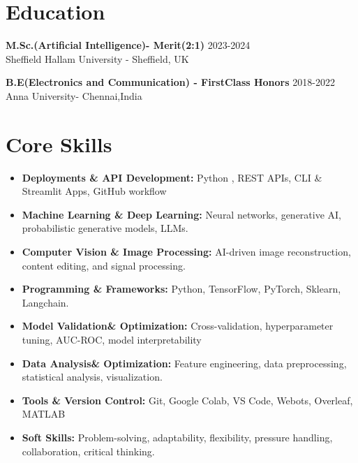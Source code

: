\documentclass[10 pt, letterpaper]{article}
\begin{document}
\section*{Education}
\textbf{M.Sc.(Artificial Intelligence)- Merit(2:1) }\hfill{2023-2024} \\ Sheffield Hallam University - Sheffield, UK

\textbf{B.E(Electronics and Communication) - FirstClass Honors }\hfill{2018-2022} \\ Anna University- Chennai,India
\vspace{-0.3cm}
\section*{Core Skills}

\begin{itemize}
    \item \textbf{Deployments \& API Development:} Python , REST APIs, CLI \& Streamlit Apps, GitHub workflow
    \vspace{-0.23cm}
    \item \textbf{Machine Learning \& Deep Learning:} Neural networks, generative AI, probabilistic generative models, LLMs.
    \vspace{-0.23cm}
    \item \textbf{Computer Vision \& Image Processing:} AI-driven image reconstruction, content editing, and signal processing.
    \vspace{-0.23cm}
    \item \textbf{Programming \& Frameworks:} Python, TensorFlow, PyTorch, Sklearn, Langchain.
    \vspace{-0.23cm}
    \item \textbf{Model Validation\& Optimization:} Cross-validation, hyperparameter tuning, AUC-ROC, model interpretability
       \vspace{-0.23cm}
    \item \textbf{Data Analysis\& Optimization:} Feature engineering, data preprocessing, statistical analysis, visualization.
    \vspace{-0.23cm}
    \item \textbf{Tools \& Version Control:} Git, Google Colab, VS Code, Webots, Overleaf, MATLAB
    \vspace{-0.23cm}
     \item \textbf{Soft Skills:} Problem-solving, adaptability, flexibility, pressure handling, collaboration, critical thinking.
    \vspace{-0.23cm}

\end{itemize}
\end{document}
